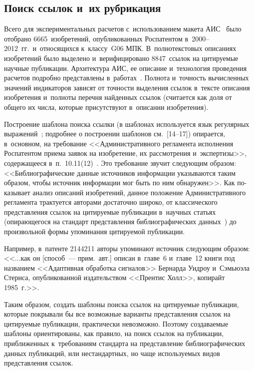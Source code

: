\begin{multicols}{2}
\section{Поиск ссылок и~их рубрикация}

  Всего для экспериментальных расчетов с~использованием макета АИС~\cite{9-zat} было отобрано 6665~изобрете\-ний,
опубликованных Роспатентом в~2000--2012~гг.\ и~относящихся к~классу~G06 МПК.
В~полнотекстовых описаниях изобретений было выделено и~верифицировано 8847~ссылок
на цитируемые научные публикации. Архитектура АИС, ее описание и~технология
проведения расчетов подробно представлены в~работах~\cite{9-zat, 12-zat}. Полнота и~точность вычисленных значений индикаторов зависят от точности выделения ссылок в~тексте описания изобретения и~полноты перечня найденных ссылок (считается как доля от
общего их числа, которые присутствуют в~описании изобретения).

  Построение шаблона поиска ссылки (в шаблонах используется язык регулярных
выражений~\cite{13-zat}; подробнее о построении шаблонов см.~[14--17])
опирается, в~основном, на требование <<Административного регламента исполнения Роспатентом приема
заявок на изобретение, их рассмотрения и~экспертизы>>, содержащееся
в~п.~10.11(12)~\cite{10-zat}. Это требование звучит следующим образом:
<<Биб\-лио\-гра\-фи\-че\-ские
данные источников информации\linebreak
 указываются таким образом, чтобы источник информации
мог быть по ним обнаружен>>. Как по-\linebreak казывает анализ описаний изобретений, данное
положе\-ние Административного регламента трактуется авторами достаточно широко, от
классического представления ссылок на цитируемые пуб\-ли\-ка\-ции в~научных статьях
(опирающегося на стандарт представления библиографических данных~\cite{18-zat}) до
произвольной формы упоминания цитируемой пуб\-ли\-кации.

  Например, в~патенте 2144211 авторы упоминают источник следующим образом:
<<$\ldots$как он [способ~--- прим.\ авт.] описан в~главе~6 и~главе~12 книги под названием
<<Адаптивная обработка сигналов>> Бернарда Уидроу и~Сэмьюэла Стернса,
опубликованной издательством <<Прентис Холл>>, копирайт 1985~г.>>.

  Таким образом, создать шаблоны поиска ссылок на цитируемые публикации, которые
покрывали бы все возможные варианты представления ссылок на цитируемые публикации,
практически невозможно. Поэтому создаваемые шаблоны ориентированы, как правило, на
поиск ссылок на публикации, приближенных к~требованиям стандарта на представление
библиографических данных публикаций, или нестандартных, но чаще используемых видов
представления ссылок.


\end{multicols}
